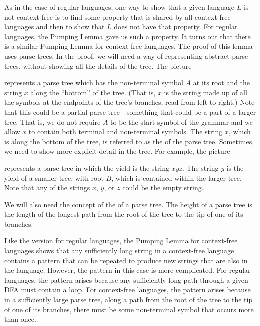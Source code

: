 As in the case of regular languages, one way to show that
a given language $L$ is not context-free is to find some property
that is shared by all context-free languages and then to show that
$L$ does not have that property.  For regular languages, the
Pumping Lemma gave us such a property.  It turns out that
there is a similar Pumping Lemma for context-free languages.
The proof of this lemma uses parse trees.  In the proof, we
will need a way of representing abstract parse trees, without
showing all the details of the tree.  The picture

\medskip
\centerline{}
\smallskip

\noindent represents a parse tree which has the non-terminal symbol
$A$ at its root and the string $x$ along the ``bottom'' of the tree.
(That is, $x$ is the string made up of all the symbols at the
endpoints of the tree's branches, read from left to right.)  Note that
this could be a partial parse tree---something that could be a part of a
larger tree.  That is, we do not require $A$ to be the start symbol
of the grammar and we allow $x$ to contain both terminal and
non-terminal symbols.  The string $x$, which is along the bottom
of the tree, is referred to as the 
of the parse tree.  Sometimes, we need to show more explicit detail in
the tree.  For example, the picture

\medskip
\centerline{}

\noindent represents a parse tree in which the yield is the
string $xyz$.  The string $y$ is the yield of a smaller tree, with
root $B$, which is contained within the larger tree.
Note that any of the strings $x$, $y$, or $z$ could be the
empty string.  

We will also need the concept of the  of a parse tree.  The height of a parse tree is
the length of the longest path from the root of the tree to the
tip of one of its branches.

Like the version for regular languages, the Pumping Lemma for
context-free languages shows that any sufficiently long string
in a context-free language contains a pattern that can be repeated
to produce new strings that are also in the language.  However,
the pattern in this case is more complicated.  For regular
languages, the pattern arises because any sufficiently long path
through a given DFA must contain a loop.   For context-free
languages, the pattern arises because in a sufficiently
large parse tree, along a path from the root of the tree to the
tip of one of its branches, there must be some non-terminal
symbol that occurs more than once.

